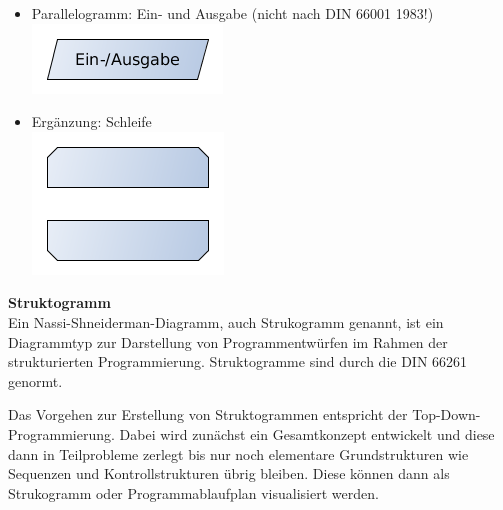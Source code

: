 \begin{itemize}
	\item Parallelogramm: Ein- und Ausgabe (nicht nach DIN 66001 1983!)\\
		\includegraphics[scale=0.5]{1jahr_pictures/lf06prog-pic/lf06prog-pap-ein-ausgabe.png}	
	\item Ergänzung: Schleife\\
		\includegraphics[scale=0.5]{1jahr_pictures/lf06prog-pic/lf06prog-pap-schleife.png}
\end{itemize}

{\bf Struktogramm}~\\

Ein Nassi-Shneiderman-Diagramm, auch Strukogramm genannt, ist ein Diagrammtyp zur Darstellung von Programmentwürfen im Rahmen der strukturierten Programmierung. Struktogramme sind durch die DIN 66261 genormt.

Das Vorgehen zur Erstellung von Struktogrammen entspricht der Top-Down-Programmierung. Dabei wird zunächst ein Gesamtkonzept entwickelt und diese dann in Teilprobleme zerlegt bis nur noch elementare Grundstrukturen wie Sequenzen und Kontrollstrukturen übrig bleiben. Diese können dann als Strukogramm oder Programmablaufplan visualisiert werden.

